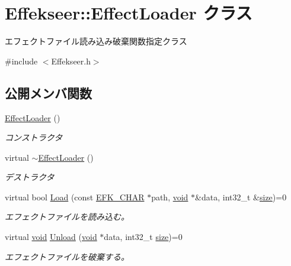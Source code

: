 \hypertarget{class_effekseer_1_1_effect_loader}{}\section{Effekseer\+:\+:Effect\+Loader クラス}
\label{class_effekseer_1_1_effect_loader}


エフェクトファイル読み込み破棄関数指定クラス  




{\ttfamily \#include $<$Effekseer.\+h$>$}

\subsection*{公開メンバ関数}
\begin{DoxyCompactItemize}
\item 
\mbox{\hyperlink{class_effekseer_1_1_effect_loader_a38e316829c64864d3a0cac68cd7724a0}{Effect\+Loader}} ()
\begin{DoxyCompactList}\small\item\em コンストラクタ \end{DoxyCompactList}\item 
virtual \mbox{\hyperlink{class_effekseer_1_1_effect_loader_a2d296c85473ebb6cae68be5305759628}{$\sim$\+Effect\+Loader}} ()
\begin{DoxyCompactList}\small\item\em デストラクタ \end{DoxyCompactList}\item 
virtual bool \mbox{\hyperlink{class_effekseer_1_1_effect_loader_a2da2924e84118ae31330f5d3c2937f29}{Load}} (const \mbox{\hyperlink{_effekseer_8h_aca7eb5de6dd019c19ac58ea35a193f2f}{E\+F\+K\+\_\+\+C\+H\+AR}} $\ast$path, \mbox{\hyperlink{namespace_effekseer_ab34c4088e512200cf4c2716f168deb56}{void}} $\ast$\&data, int32\+\_\+t \&\mbox{\hyperlink{namespace_effekseer_a73c68f3d33539d30844b9d1e058077f7}{size}})=0
\begin{DoxyCompactList}\small\item\em エフェクトファイルを読み込む。 \end{DoxyCompactList}\item 
virtual \mbox{\hyperlink{namespace_effekseer_ab34c4088e512200cf4c2716f168deb56}{void}} \mbox{\hyperlink{class_effekseer_1_1_effect_loader_a6c033478a92355db775a2bfa9e3b6115}{Unload}} (\mbox{\hyperlink{namespace_effekseer_ab34c4088e512200cf4c2716f168deb56}{void}} $\ast$data, int32\+\_\+t \mbox{\hyperlink{namespace_effekseer_a73c68f3d33539d30844b9d1e058077f7}{size}})=0
\begin{DoxyCompactList}\small\item\em エフェクトファイルを破棄する。 \end{DoxyCompactList}\end{DoxyCompactItemize}


